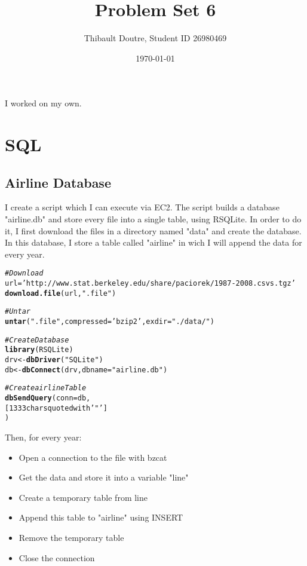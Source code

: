 \documentclass{llncs}\usepackage[]{graphicx}\usepackage[]{color}
\makeatletter
\newcommand{\hlstr}[1]{\textcolor[rgb]{0.192,0.494,0.8}{#1}}%
\newcommand{\hlcom}[1]{\textcolor[rgb]{0.678,0.584,0.686}{\textit{#1}}}%
\newcommand{\hlstd}[1]{\textcolor[rgb]{0.345,0.345,0.345}{#1}}%
\newcommand{\hlkwb}[1]{\textcolor[rgb]{0.69,0.353,0.396}{#1}}%
\newcommand{\hlkwc}[1]{\textcolor[rgb]{0.333,0.667,0.333}{#1}}%
\newcommand{\hlkwd}[1]{\textcolor[rgb]{0.737,0.353,0.396}{\textbf{#1}}}%
\newenvironment{kframe}{%
 \def\at@end@of@kframe{}%
 \ifinner\ifhmode%
  \def\at@end@of@kframe{\end{minipage}}%
  \begin{minipage}{\columnwidth}%
 \fi\fi%
 \def\FrameCommand##1{\hskip\@totalleftmargin \hskip-\fboxsep
 \colorbox{shadecolor}{##1}\hskip-\fboxsep
     \hskip-\linewidth \hskip-\@totalleftmargin \hskip\columnwidth}%
 \MakeFramed {\advance\hsize-\width
   \@totalleftmargin\z@ \linewidth\hsize
   \@setminipage}}%
 {\par\unskip\endMakeFramed%
 \at@end@of@kframe}
\newenvironment{knitrout}{}{} %
\makeatother
\begin{document}
\title{Problem Set 6}
\author{Thibault Doutre, Student ID 26980469}
\date{\today}
\maketitle
\bigbreak
\noindent
I worked on my own.
\section{SQL}
\subsection{Airline Database}
I create a script which I can execute via EC2. The script builds a database "airline.db" and store every file into a single table, using RSQLite. In order to do it, I first download the files in a directory named "data" and create the database. In this database, I store a table called "airline" in wich I will append the data for every year.
\begin{knitrout}
\color{fgcolor}\begin{kframe}
\begin{alltt}
\hlcom{#Download}
\hlstd{url} \hlkwb{=} \hlstr{'http://www.stat.berkeley.edu/share/paciorek/1987-2008.csvs.tgz'}
\hlkwd{download.file}\hlstd{(url,} \hlstr{".file"}\hlstd{)}

\hlcom{# Untar}
\hlkwd{untar}\hlstd{(}\hlstr{".file"}\hlstd{,} \hlkwc{compressed} \hlstd{=} \hlstr{'bzip2'}\hlstd{,} \hlkwc{exdir} \hlstd{=} \hlstr{"./data/"}\hlstd{)}

\hlcom{# Create Database}
\hlkwd{library}\hlstd{(RSQLite)}
\hlstd{drv} \hlkwb{<-} \hlkwd{dbDriver}\hlstd{(}\hlstr{"SQLite"}\hlstd{)}
\hlstd{db} \hlkwb{<-} \hlkwd{dbConnect}\hlstd{(drv,} \hlkwc{dbname} \hlstd{=} \hlstr{"airline.db"}\hlstd{)}

\hlcom{# Create airline Table}
\hlkwd{dbSendQuery}\hlstd{(}\hlkwc{conn} \hlstd{= db,}
            \hlstr{[1333 chars quoted with '"']}
\hlstd{)}
\end{alltt}
\end{kframe}
\end{knitrout}
Then, for every year:
\begin{itemize}
\item Open a connection to the file with bzcat 
\item Get the data and store it into a variable "line"
\item Create a temporary table from line
\item Append this table to "airline" using INSERT
\item Remove the temporary table
\item Close the connection
\end{itemize}
\end{document}
